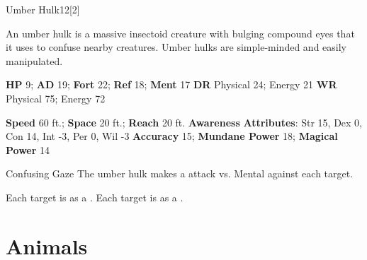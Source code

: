   \begin{monsection}{Umber Hulk}{12}[2]
    \vspace{-1em}\vspace{-1em}
    \vspace{0em}

    
    An umber hulk is a massive insectoid creature with bulging compound eyes that it uses to
    confuse nearby creatures. Umber hulks are simple-minded and easily manipulated.
  

    \begin{spellcontent}
      \begin{spelltargetinginfo}
        \pari \textbf{HP} 9;
          \textbf{AD} 19;
          \textbf{Fort} 22;
          \textbf{Ref} 18;
          \textbf{Ment} 17
        \pari \textbf{DR} Physical 24; Energy 21
        \pari \textbf{WR} Physical 75; Energy 72
        
      \end{spelltargetinginfo}
    \end{spellcontent}
    \begin{monsterfooter}
      \pari \textbf{Speed} 60 ft.;
        \textbf{Space} 20 ft.;
        \textbf{Reach} 20 ft.
      \pari \textbf{Awareness} 
      \pari \textbf{Attributes}:
        Str 15, Dex 0,
        Con 14, Int -3,
        Per 0, Wil -3
      \pari \textbf{Accuracy} 15;
        \textbf{Mundane Power} 18;
      \textbf{Magical Power} 14
    \end{monsterfooter}
  \end{monsection}
  \begin{freeability}{Confusing Gaze}
       The umber hulk makes a  attack
        vs. Mental against each target.
    
    \hit Each target is  as a .
    \crit Each target is  as a .
    \end{freeability}
  
        \section{Animals}
      
